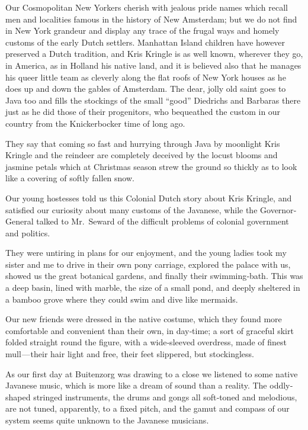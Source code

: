 \documentclass[12pt]{book}
\begin{document}
Our Cosmopolitan New Yorkers cherish with jealous pride names which recall
men and localities famous in the history of New Amsterdam; but we do not find in
New York grandeur and display any trace of the frugal ways and homely customs
of the early Dutch settlers. Manhattan Island children have however preserved a
Dutch tradition, and Kris Kringle is as well known, wherever they go, in America,
as in Holland his native land, and it is believed also that he manages his queer
little team as cleverly along the flat roofs of New York houses as he does up and
down the gables of Amsterdam. The dear, jolly old saint goes to Java too and
fills the stockings of the small “good” Diedrichs and Barbaras there just as he did
those of their progenitors, who bequeathed the custom in our country from the
Knickerbocker time of long ago.

They say that coming so fast and hurrying through Java by moonlight Kris
Kringle and the reindeer are completely deceived by the locust blooms and jasmine
petals which at Christmas season strew the ground so thickly as to look like a
covering of softly fallen snow.

Our young hostesses told us this Colonial Dutch story about Kris Kringle,
and satisfied our curiosity about many customs of the Javanese, while the Governor‐General talked to Mr.~Seward of the difficult problems of colonial government
and politics.

They were untiring in plans for our enjoyment, and the young ladies took my
sister and me to drive in their own pony carriage, explored the palace with us,
showed us the great botanical gardens, and finally their swimming‐bath. This
was a deep basin, lined with marble, the size of a small pond, and deeply sheltered
in a bamboo grove where they could swim and dive like mermaids.

Our new friends were dressed in the native costume, which they found more
comfortable and convenient than their own, in day‐time; a sort of graceful skirt
folded straight round the figure, with a wide‐sleeved overdress, made of finest
mull — their hair light and free, their feet slippered, but stockingless.

As our first day at Buitenzorg was drawing to a close we listened to some
native Javanese music, which is more like a dream of sound than a reality. The
oddly‐shaped stringed instruments, the drums and gongs all soft‐toned and melodious, are not tuned, apparently, to a fixed pitch, and the gamut and compass of
our system seems quite unknown to the Javanese musicians.
\end{document}

